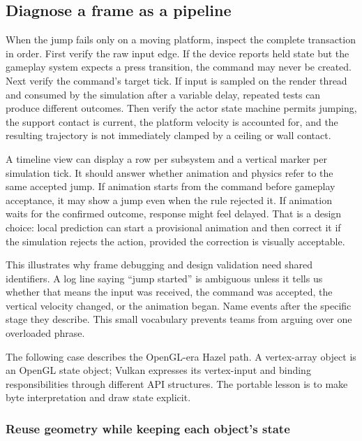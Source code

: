 \subsection{Diagnose a frame as a pipeline}\label{06-engine-ii-ch026-diagnose-a-frame-as-a-pipeline}

When the jump fails only on a moving platform, inspect the complete transaction in order. First verify the raw input edge. If the device reports held state but the gameplay system expects a press transition, the command may never be created. Next verify the command's target tick. If input is sampled on the render thread and consumed by the simulation after a variable delay, repeated tests can produce different outcomes. Then verify the actor state machine permits jumping, the support contact is current, the platform velocity is accounted for, and the resulting trajectory is not immediately clamped by a ceiling or wall contact.

A timeline view can display a row per subsystem and a vertical marker per simulation tick. It should answer whether animation and physics refer to the same accepted jump. If animation starts from the command before gameplay acceptance, it may show a jump even when the rule rejected it. If animation waits for the confirmed outcome, response might feel delayed. That is a design choice: local prediction can start a provisional animation and then correct it if the simulation rejects the action, provided the correction is visually acceptable.

This illustrates why frame debugging and design validation need shared identifiers. A log line saying ``jump started'' is ambiguous unless it tells us whether that means the input was received, the command was accepted, the vertical velocity changed, or the animation began. Name events after the specific stage they describe. This small vocabulary prevents teams from arguing over one overloaded phrase.

The following case describes the OpenGL-era Hazel path. A vertex-array object is an OpenGL state object; Vulkan expresses its vertex-input and binding responsibilities through different API structures. The portable lesson is to make byte interpretation and draw state explicit.

\subsubsection{Reuse geometry while keeping each object's state}\label{06-engine-ii-ch026-reuse-geometry-while-keeping-each-objects-state}

